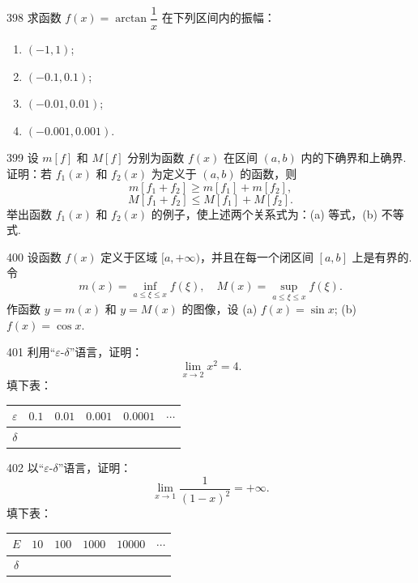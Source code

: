 \begin{prob}[L]{398}
求函数 $f(x) = \arctan\dfrac{1}{x}$ 在下列区间内的振幅：
\begin{enumerate}[label=(\alph*), itemsep=2pt, topsep=3pt]
  \item $(-1, 1)$;
  \item $(-0.1, 0.1)$;
  \item $(-0.01, 0.01)$;
  \item $(-0.001, 0.001)$.
\end{enumerate}
\end{prob}

\begin{prob}[M]{399}
设 $m[f]$ 和 $M[f]$ 分别为函数 $f(x)$ 在区间 $(a, b)$ 内的下确界和上确界.
证明：若 $f_1(x)$ 和 $f_2(x)$ 为定义于 $(a, b)$ 的函数，则
\[
m[f_1 + f_2] \geqslant m[f_1] + m[f_2],
\]
\[
M[f_1 + f_2] \leqslant M[f_1] + M[f_2].
\]
举出函数 $f_1(x)$ 和 $f_2(x)$ 的例子，使上述两个关系式为：(a) 等式，(b) 不等式.
\end{prob}

\begin{prob}[M]{400}
设函数 $f(x)$ 定义于区域 $[a, +\infty)$，并且在每一个闭区间 $[a, b]$ 上是有界的. 令
\[
m(x) = \inf_{a \leqslant \xi \leqslant x} f(\xi), \quad M(x) = \sup_{a \leqslant \xi \leqslant x} f(\xi).
\]
作函数 $y = m(x)$ 和 $y = M(x)$ 的图像，设
(a) $f(x) = \sin x$; \qquad (b) $f(x) = \cos x$.
\end{prob}

\begin{prob}[M]{401}
利用“$\varepsilon$-$\delta$”语言，证明：
\[
\lim_{x \to 2} x^2 = 4.
\]
填下表：
\begin{center}
\begin{tabular}{c|c|c|c|c|c}
\hline
$\varepsilon$ & $0.1$ & $0.01$ & $0.001$ & $0.0001$ & $\cdots$ \\
\hline
$\delta$ & & & & & \\
\hline
\end{tabular}
\end{center}
\end{prob}

\begin{prob}[M]{402}
以“$\varepsilon$-$\delta$”语言，证明：
\[
\lim_{x \to 1} \frac{1}{(1 - x)^2} = +\infty.
\]
填下表：
\begin{center}
\begin{tabular}{c|c|c|c|c|c}
\hline
$E$ & $10$ & $100$ & $1000$ & $10000$ & $\cdots$ \\
\hline
$\delta$ & & & & & \\
\hline
\end{tabular}
\end{center}
\end{prob}

